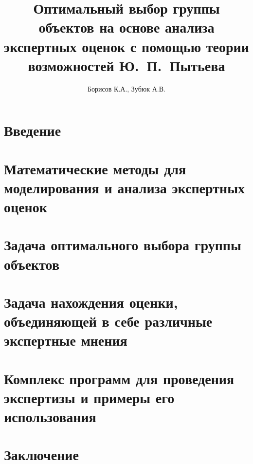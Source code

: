 \documentclass{article}
\begin{document}

\thispagestyle{empty}			

\title{Оптимальный выбор группы объектов на основе анализа экспертных оценок с помощью теории возможностей Ю.~П.~Пытьева} 
\author{Борисов К.А., Зубюк А.В.}
\maketitle

\tableofcontents
\newpage

\section{Введение} 


\section{Математические методы для моделирования и анализа экспертных оценок}
% 

\section{Задача оптимального выбора группы объектов}
 

\section{Задача нахождения оценки, объединяющей в себе различные экспертные мнения}
% 

\section{Комплекс программ для проведения экспертизы и примеры его использования }
% 

\section{Заключение}
% 

\end{document}

